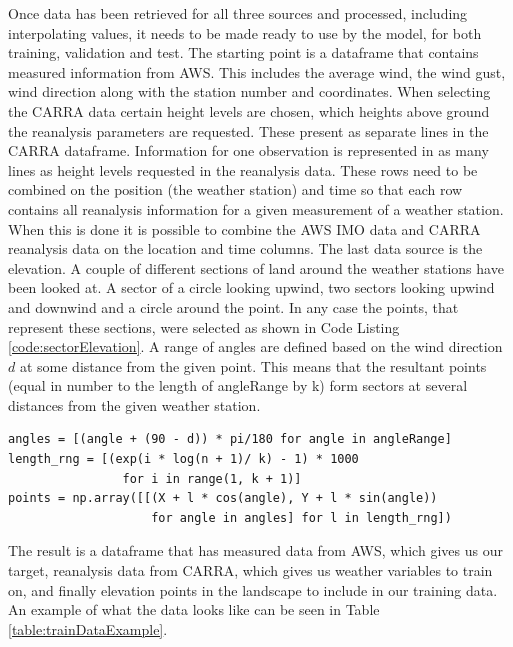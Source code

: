 Once data has been retrieved for all three sources and processed, including interpolating values, it needs to be made ready to use by the model, for both training, validation and test. The starting point is a dataframe that contains measured information from AWS. This includes the average wind, the wind gust, wind direction along with the station number and coordinates. When selecting the CARRA data certain height levels are chosen, which heights above ground the reanalysis parameters are requested. These present as separate lines in the CARRA dataframe. Information for one observation is represented in as many lines as height levels requested in the reanalysis data. These rows need to be combined on the position (the weather station) and time so that each row contains all reanalysis information for a given measurement of a weather station. When this is done it is possible to combine the AWS IMO data and CARRA reanalysis data on the location and time columns. The last data source is the elevation. A couple of different sections of land around the weather stations have been looked at. A sector of a circle looking upwind, two sectors looking upwind and downwind and a circle around the point. In any case the points, that represent these sections, were selected as shown in Code Listing \ref{code:sectorElevation}. A range of angles are defined based on the wind direction $d$ at some distance from the given point. This means that the resultant points (equal in number to the length of angleRange by k) form sectors at several distances from the given weather station.

\begin{lstlisting}[style = Python, caption = {Sector elevation points generated}, label = code:sectorElevation]
angles = [(angle + (90 - d)) * pi/180 for angle in angleRange]
length_rng = [(exp(i * log(n + 1)/ k) - 1) * 1000 
                for i in range(1, k + 1)]
points = np.array([[(X + l * cos(angle), Y + l * sin(angle))
                    for angle in angles] for l in length_rng])   
\end{lstlisting}

The result is a dataframe that has measured data from AWS, which gives us our target, reanalysis data from CARRA, which gives us weather variables to train on, and finally elevation points in the landscape to include in our training data. An example of what the data looks like can be seen in Table \ref{table:trainDataExample}.

\begin{table}[h]
    \caption{An example of data structure used with model}
    \label{table:trainDataExample}
\end{table}

